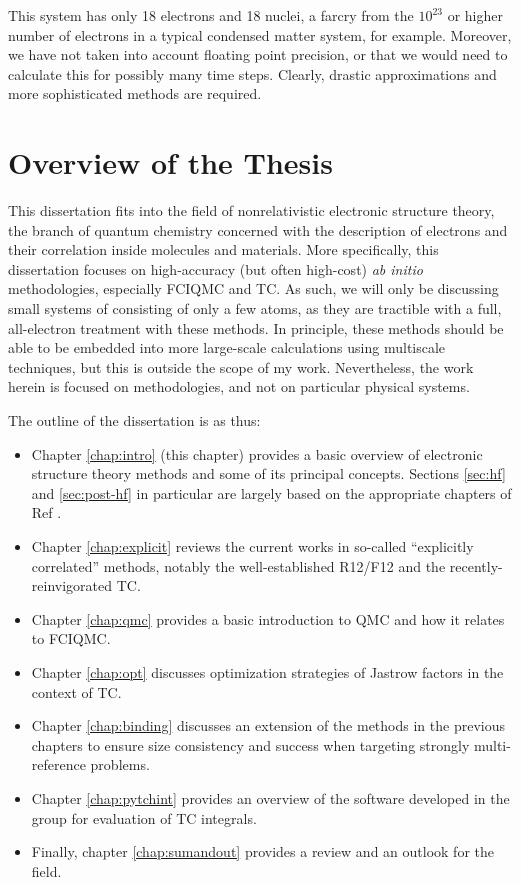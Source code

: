 This system has only 18 electrons and 18 nuclei, a farcry from the $10^{23}$ or higher number of electrons in a typical condensed matter system, for example. Moreover, we have not taken into account floating point precision, or that we would need to calculate this for possibly many time steps. Clearly, drastic approximations and more sophisticated methods are required.

\section{Overview of the Thesis}

This dissertation fits into the field of nonrelativistic electronic structure theory, the branch of quantum chemistry concerned with the description of electrons and their correlation inside molecules and materials. More specifically, this dissertation focuses on high-accuracy (but often high-cost) \emph{ab initio} methodologies, especially \gls{FCIQMC} and \gls{TC}. As such, we will only be discussing small systems of consisting of only a few atoms, as they are tractible with a full, all-electron treatment with these methods. In principle, these methods should be able to be embedded  into more large-scale calculations using multiscale techniques, but this is outside the scope of my work. Nevertheless, the work herein is focused on methodologies, and not on particular physical systems.

The outline of the dissertation is as thus:
\begin{itemize}
    \item Chapter \ref{chap:intro} (this chapter) provides a basic overview of electronic structure theory methods and some of its principal concepts. Sections \ref{sec:hf} and \ref{sec:post-hf} in particular are largely based on the appropriate chapters of Ref .
    \item Chapter \ref{chap:explicit} reviews the current works in so-called ``explicitly correlated'' methods, notably the well-established R12/F12 and the recently-reinvigorated \gls{TC}.
    \item Chapter \ref{chap:qmc} provides a basic introduction to \gls{QMC} and how it relates to \gls{FCIQMC}.
    \item Chapter \ref{chap:opt} discusses optimization strategies of Jastrow factors in the context of \gls{TC}.
    \item Chapter \ref{chap:binding} discusses an extension of the methods in the previous chapters to ensure size consistency and success when targeting strongly multi-reference problems.
    \item Chapter \ref{chap:pytchint} provides an overview of the software \pytchint developed in the group for evaluation of \gls{TC} integrals.
    \item Finally, chapter \ref{chap:sumandout} provides a review and an outlook for the field.
\end{itemize}



